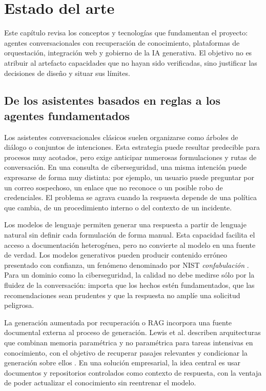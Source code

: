 \chapter{Estado del arte}
\label{chap:estado-arte}

Este capítulo revisa los conceptos y tecnologías que fundamentan el proyecto:
agentes conversacionales con recuperación de conocimiento, plataformas de
orquestación, integración web y gobierno de la IA generativa. El objetivo no es
atribuir al artefacto capacidades que no hayan sido verificadas, sino justificar
las decisiones de diseño y situar sus límites.

\section{De los asistentes basados en reglas a los agentes fundamentados}
\label{sec:evolucion-agentes}

Los asistentes conversacionales clásicos suelen organizarse como árboles de
diálogo o conjuntos de intenciones. Esta estrategia puede resultar predecible
para procesos muy acotados, pero exige anticipar numerosas formulaciones y rutas
de conversación. En una consulta de ciberseguridad, una misma intención puede
expresarse de forma muy distinta: por ejemplo, un usuario puede preguntar por un
correo sospechoso, un enlace que no reconoce o un posible robo de credenciales.
El problema se agrava cuando la respuesta depende de una política que cambia, de
un procedimiento interno o del contexto de un incidente.

Los modelos de lenguaje permiten generar una respuesta a partir de lenguaje
natural sin definir cada formulación de forma manual. Esta capacidad facilita el
acceso a documentación heterogénea, pero no convierte al modelo en una fuente de
verdad. Los modelos generativos pueden producir contenido erróneo presentado con
confianza, un fenómeno denominado por NIST \emph{confabulación}
\cite{nistGenAi2024}. Para un dominio como la ciberseguridad, la calidad no debe
medirse sólo por la fluidez de la conversación: importa que los hechos estén
fundamentados, que las recomendaciones sean prudentes y que la respuesta no
amplíe una solicitud peligrosa.

La generación aumentada por recuperación o RAG incorpora una fuente documental
externa al proceso de generación. Lewis et al. describen arquitecturas que
combinan memoria paramétrica y no paramétrica para tareas intensivas en
conocimiento, con el objetivo de recuperar pasajes relevantes y condicionar la
generación sobre ellos \cite{lewis2020rag}. En una solución empresarial, la idea
central es usar documentos y repositorios controlados como contexto de respuesta,
con la ventaja de poder actualizar el conocimiento sin reentrenar el modelo.

